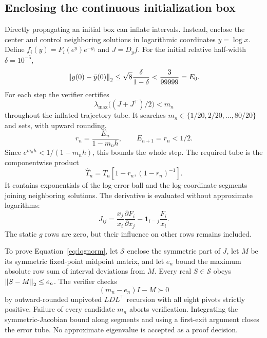\subsection{Enclosing the continuous initialization box}
Directly propagating an initial box can inflate intervals. Instead, enclose the center and control neighboring solutions in logarithmic coordinates $y=\log x$. Define $f_i(y)=F_i(e^y)e^{-y_i}$ and $J=D_yf$. For the initial relative half-width $\delta=10^{-5}$,
\begin{equation}
\left\lVert y(0)-\bar y(0)\right\rVert_2\leq\sqrt8\frac{\delta}{1-\delta}<\frac3{99999}=E_0.
\end{equation}
For each step the verifier certifies
\begin{equation}
\lambda_{\max}\big((J+J^\top)/2\big)<m_n
\label{eq:lognorm}
\end{equation}
throughout the inflated trajectory tube. It searches $m_n\in\{1/20,2/20,\ldots,80/20\}$ and sets, with upward rounding,
\begin{equation}
r_n=\frac{E_n}{1-m_nh},\qquad E_{n+1}=r_n<1/2.
\end{equation}
Since $e^{m_nh}<1/(1-m_nh)$, this bounds the whole step. The required tube is the componentwise product
\begin{equation}
\widehat T_n=T_n[1-r_n,(1-r_n)^{-1}].
\end{equation}
It contains exponentials of the log-error ball and the log-coordinate segments joining neighboring solutions. The derivative is evaluated without approximate logarithms:
\begin{equation}
J_{ij}=\frac{x_j}{x_i}\frac{\partial F_i}{\partial x_j}
-\mathbf1_{i=j}\frac{F_i}{x_i}.
\end{equation}
The static $g$ rows are zero, but their influence on other rows remains included.

To prove Equation~\eqref{eq:lognorm}, let $\mathscr S$ enclose the symmetric part of $J$, let $M$ be its symmetric fixed-point midpoint matrix, and let $e_n$ bound the maximum absolute row sum of interval deviations from $M$. Every real $S\in\mathscr S$ obeys $\left\lVert S-M\right\rVert_2\leq e_n$. The verifier checks
\begin{equation}
(m_n-e_n)I-M\succ0
\end{equation}
by outward-rounded unpivoted $LDL^\top$ recursion with all eight pivots strictly positive. Failure of every candidate $m_n$ aborts verification. Integrating the symmetric-Jacobian bound along segments and using a first-exit argument closes the error tube. No approximate eigenvalue is accepted as a proof decision.

